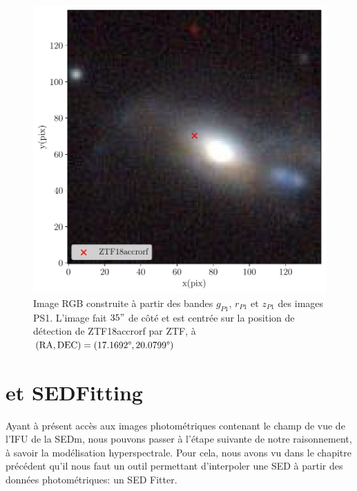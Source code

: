 \documentclass[../main/main.tex]{subfiles}
\begin{document}
\begin{figure}[ht]
  \begin{minipage}[c]{0.45\textwidth}
    \includegraphics[width=\textwidth]{../figures/05_sedfit/ps_cutouts_ZTF18accrorf.pdf}
  \end{minipage}\hfill
  \begin{minipage}[c]{0.52\textwidth}
    \caption[Image RGB de PS1 centrée sur ZTF18accrorf.]{Image RGB
      construite à partir des bandes $g_{P1}$, $r_{P1}$ et
      $z_{P1}$ des images PS1. L'image fait $35"$ de côté et est centrée sur la position de
      détection de ZTF18accrorf par ZTF, à $(\text{RA}, \text{DEC})=(17.1692\degree,20.0799\degree)$}\label{fig:pscutoutsZTF18accrorf}
  \end{minipage}
\end{figure}


\section{ et SEDFitting}
\label{sec:cigale}

Ayant à présent accès aux images photométriques contenant le champ
de vue de l'IFU de la SEDm, nous pouvons passer à l'étape suivante de
notre raisonnement, à savoir la modélisation hyperspectrale. Pour cela,
nous avons vu dans le chapitre précédent qu'il nous faut un outil
permettant d'interpoler une SED à partir des données
photométriques: un SED Fitter. 
\end{document}
